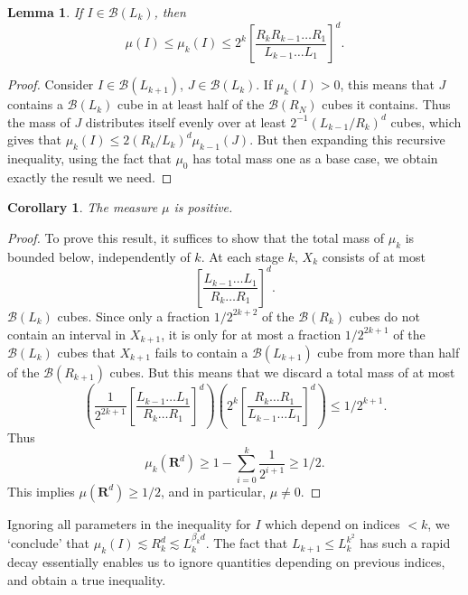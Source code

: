 \documentclass{article}
\theoremstyle{plain}
\newtheorem{lemma}{Lemma}
\newtheorem{corollary}{Corollary}
\theoremstyle{plain}
\begin{document}
\begin{lemma}
	If $I \in \mathcal{B}(L_k)$, then
	\[ \mu(I) \leq \mu_k(I) \leq 2^k \left[ \frac{R_k R_{k-1} \dots R_1}{L_{k-1} \dots L_1} \right]^d. \]
\end{lemma}
\begin{proof}
	Consider $I \in \mathcal{B}(L_{k+1})$, $J \in \mathcal{B}(L_k)$. If $\mu_k(I) > 0$, this means that $J$ contains a $\mathcal{B}(L_k)$ cube in at least half of the $\mathcal{B}(R_N)$ cubes it contains. Thus the mass of $J$ distributes itself evenly over at least $2^{-1} (L_{k-1}/R_k)^d$ cubes, which gives that $\mu_k(I) \leq 2(R_k/L_k)^d \mu_{k-1}(J)$. But then expanding this recursive inequality, using the fact that $\mu_0$ has total mass one as a base case, we obtain exactly the result we need.
\end{proof}

\begin{corollary}
	The measure $\mu$ is positive.
\end{corollary}
\begin{proof}
	To prove this result, it suffices to show that the total mass of $\mu_k$ is bounded below, independently of $k$. At each stage $k$, $X_k$ consists of at most
	\[ \left[ \frac{L_{k-1} \dots L_1}{R_k \dots R_1} \right]^d. \]
	$\mathcal{B}(L_k)$ cubes. Since only a fraction $1/2^{2k+2}$ of the $\mathcal{B}(R_k)$ cubes do not contain an interval in $X_{k+1}$, it is only for at most a fraction $1/2^{2k+1}$ of the $\mathcal{B}(L_k)$ cubes that $X_{k+1}$ fails to contain a $\mathcal{B}(L_{k+1})$ cube from more than half of the $\mathcal{B}(R_{k+1})$ cubes. But this means that we discard a total mass of at most
	\[ \left( \frac{1}{2^{2k + 1}} \left[ \frac{L_{k-1} \dots L_1}{R_k \dots R_1} \right]^d \right) \left( 2^{k} \left[ \frac{R_k \dots R_1}{L_{k-1} \dots L_1} \right]^d \right) \leq 1/2^{k+1}. \]
	Thus
	\[ \mu_k(\mathbf{R}^d) \geq 1 - \sum_{i = 0}^k \frac{1}{2^{i+1}} \geq 1/2. \]
	This implies $\mu(\mathbf{R}^d) \geq 1/2$, and in particular, $\mu \neq 0$.
\end{proof}

Ignoring all parameters in the inequality for $I$ which depend on indices $< k$, we `conclude' that $\mu_k(I) \lesssim R_k^d \lesssim L_k^{\beta_k d}$. The fact that $L_{k+1} \leq L_k^{k^2}$ has such a rapid decay essentially enables us to ignore quantities depending on previous indices, and obtain a true inequality.
\end{document}
